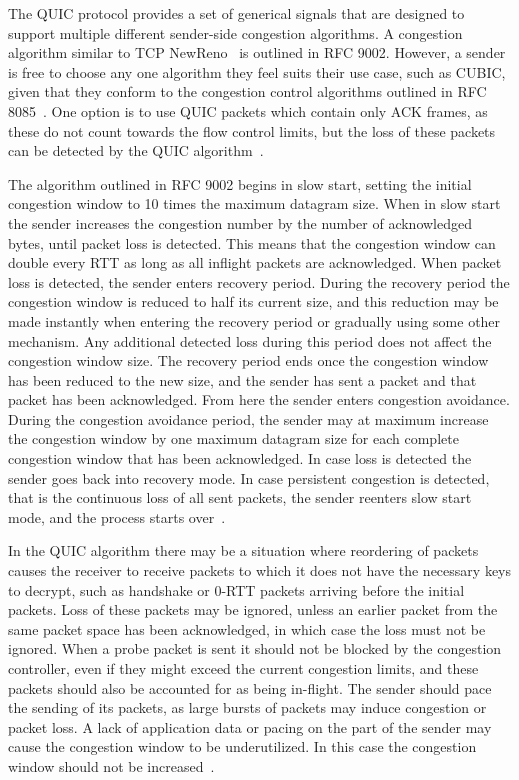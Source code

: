 \documentclass[english, 12pt, a4paper, elec, utf8, a-2b, online]{aaltothesis}
\begin{document}
The QUIC protocol provides a set of generical signals that are designed to support
multiple different sender-side congestion algorithms. A congestion algorithm similar
to TCP NewReno~\cite{rfc6582} is outlined in RFC 9002. However, a sender is free to
choose any one algorithm they feel suits their use case, such as CUBIC, given that they conform
to the congestion control algorithms outlined in RFC 8085~\cite{rfc8085}. One option
is to use QUIC packets which contain only ACK frames, as these do not count towards
the flow control limits, but the loss of these packets can be detected by the QUIC
algorithm~\cite{rfc9002}.

The algorithm outlined in RFC 9002 begins in slow start, setting the initial congestion
window to 10 times the maximum datagram size. When in slow start the sender increases
the congestion number by the number of acknowledged bytes, until packet loss is detected. This
means that the congestion window can double every RTT as long as all inflight packets
are acknowledged. When packet loss is detected, the sender enters recovery period.
During the recovery period the congestion window is reduced to half its current
size, and this reduction may be made instantly when entering the recovery period
or gradually using some other mechanism. Any additional detected loss during this
period does not affect the congestion window size. The recovery period ends once
the congestion window has been reduced to the new size, and the sender has sent
a packet and that packet has been acknowledged. From here the sender enters congestion 
avoidance. During the congestion avoidance period, the sender may at maximum increase
the congestion window by one maximum datagram size for each complete congestion
window that has been acknowledged. In case loss is detected the sender goes back
into recovery mode. In case persistent congestion is detected, that is the continuous
loss of all sent packets, the sender reenters slow start mode, and the process
starts over~\cite{rfc9002}.

In the QUIC algorithm there may be a situation where reordering of packets causes
the receiver to receive packets to which it does not have the necessary keys to
decrypt, such as handshake or 0-RTT packets arriving before the initial packets.
Loss of these packets may be ignored, unless an earlier packet from the same packet space
has been acknowledged, in which case the loss must not be ignored. When a probe
packet is sent it should not be blocked by the congestion controller, even if they might exceed the current
congestion limits, and these packets should also be accounted for as being in-flight. The
sender should pace the sending of its packets, as large bursts of packets may induce 
congestion or packet loss. A lack of application data or pacing on the part of the
sender may cause the congestion window to be underutilized. In this case the congestion
window should not be increased~\cite{rfc9002}.
\end{document}

